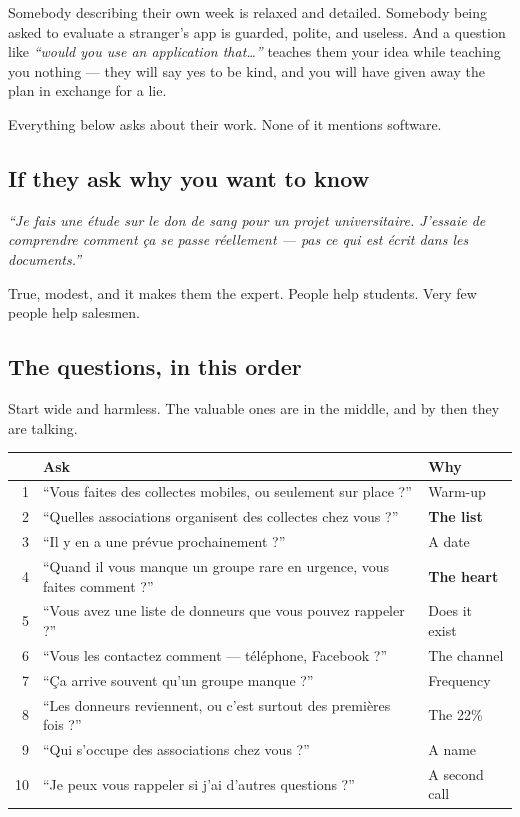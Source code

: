 \documentclass[11pt,a4paper]{article}
\newenvironment{say}
  {\par\medskip\noindent\begin{lrbox}{\saybox}%
   \begin{minipage}{\dimexpr\textwidth-2\fboxsep-2pt}\itshape\vspace{4pt}}
  {\vspace{4pt}\end{minipage}\end{lrbox}%
   \fcolorbox{rule}{sayBg}{\usebox{\saybox}}\par\medskip}
\begin{document}
Somebody describing their own week is relaxed and detailed. Somebody being asked
to evaluate a stranger's app is guarded, polite, and useless. And a question
like \emph{``would you use an application that\ldots''} teaches them your idea
while teaching you nothing --- they will say yes to be kind, and you will have
given away the plan in exchange for a lie.

Everything below asks about their work. None of it mentions software.

\subsection{If they ask why you want to know}

\begin{say}
``Je fais une \'etude sur le don de sang pour un projet universitaire. J'essaie de
comprendre comment \c{c}a se passe r\'eellement --- pas ce qui est \'ecrit dans les
documents.''
\end{say}

True, modest, and it makes them the expert. People help students. Very few
people help salesmen.

\subsection{The questions, in this order}

Start wide and harmless. The valuable ones are in the middle, and by then they
are talking.

\begin{center}
\begin{tabularx}{\textwidth}{@{}rXl@{}}
\toprule
& \textbf{Ask} & \textbf{Why} \\
\midrule
1 & ``Vous faites des collectes mobiles, ou seulement sur place ?'' &
Warm-up \\
2 & ``Quelles associations organisent des collectes chez vous ?'' &
\textbf{The list} \\
3 & ``Il y en a une pr\'evue prochainement ?'' &
A date \\
4 & ``Quand il vous manque un groupe rare en urgence, vous faites comment ?'' &
\textbf{The heart} \\
5 & ``Vous avez une liste de donneurs que vous pouvez rappeler ?'' &
Does it exist \\
6 & ``Vous les contactez comment --- t\'el\'ephone, Facebook ?'' &
The channel \\
7 & ``\c{C}a arrive souvent qu'un groupe manque ?'' &
Frequency \\
8 & ``Les donneurs reviennent, ou c'est surtout des premi\`eres fois ?'' &
The 22\% \\
9 & ``Qui s'occupe des associations chez vous ?'' &
A name \\
10 & ``Je peux vous rappeler si j'ai d'autres questions ?'' &
A second call \\
\bottomrule
\end{tabularx}
\end{center}
\end{document}

